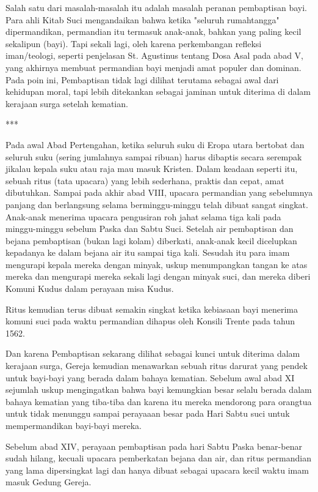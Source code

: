     Salah satu dari masalah-masalah itu adalah masalah peranan pembaptisan bayi. Para ahli Kitab Suci mengandaikan bahwa ketika "seluruh rumahtangga" dipermandikan, permandian itu termasuk anak-anak, bahkan yang paling kecil sekalipun (bayi). Tapi sekali lagi, oleh karena perkembangan refleksi iman/teologi, seperti penjelasan St. Agustinus tentang Dosa Asal pada abad V, yang akhirnya membuat permandian bayi menjadi amat populer dan dominan. Pada poin ini, Pembaptisan tidak lagi dilihat terutama sebagai awal dari kehidupan moral, tapi lebih ditekankan sebagai jaminan untuk diterima di dalam kerajaan surga setelah kematian.

    \begin{center}***\end{center}

    Pada awal Abad Pertengahan, ketika seluruh suku di Eropa utara bertobat dan seluruh suku (sering jumlahnya sampai ribuan) harus dibaptis secara serempak jikalau kepala suku atau raja mau masuk Kristen. Dalam keadaan seperti itu, sebuah ritus (tata upacara) yang lebih sederhana, praktis dan cepat, amat dibutuhkan. Sampai pada akhir abad VIII, upacara permandian yang sebelumnya panjang dan berlangsung selama berminggu-minggu telah dibuat sangat singkat. Anak-anak menerima upacara pengusiran roh jahat selama tiga kali pada minggu-minggu sebelum Paska dan Sabtu Suci. Setelah air pembaptisan dan bejana pembaptisan (bukan lagi kolam) diberkati, anak-anak kecil dicelupkan kepadanya ke dalam bejana air itu sampai tiga kali. Sesudah itu para imam mengurapi kepala mereka dengan minyak, uskup menumpangkan tangan ke atas mereka dan mengurapi mereka sekali lagi dengan minyak suci, dan mereka diberi Komuni Kudus dalam perayaan misa Kudus.

    Ritus kemudian terus dibuat semakin singkat ketika kebiasaan bayi menerima komuni suci pada waktu permandian dihapus oleh Konsili Trente pada tahun 1562.

    Dan karena Pembaptisan sekarang dilihat sebagai kunci untuk diterima dalam kerajaan surga, Gereja kemudian menawarkan sebuah ritus darurat yang pendek untuk bayi-bayi yang berada dalam bahaya kematian. Sebelum awal abad XI sejumlah uskup mengingatkan bahwa bayi kemungkian besar selalu berada dalam bahaya kematian yang tiba-tiba dan karena itu mereka mendorong para orangtua untuk tidak menunggu sampai perayaaan besar pada Hari Sabtu suci untuk mempermandikan bayi-bayi mereka.

    Sebelum abad XIV, perayaan pembaptisan pada hari Sabtu Paska benar-benar sudah hilang, kecuali upacara pemberkatan bejana dan air, dan ritus permandian yang lama dipersingkat lagi dan hanya dibuat sebagai upacara kecil waktu imam masuk Gedung Gereja.

